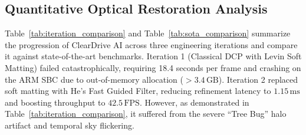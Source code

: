 \documentclass[conference]{IEEEtran}
\begin{document}
\begin{table}[t]
\centering
\caption{State-of-the-Art Quantitative Comparison on RESIDE Outdoor (SOTS) and Foggy Cityscapes Benchmarks}
\label{tab:sota_comparison}
\end{table}

\subsection{Quantitative Optical Restoration Analysis}
Table~\ref{tab:iteration_comparison} and Table~\ref{tab:sota_comparison} summarize the progression of ClearDrive AI across three engineering iterations and compare it against state-of-the-art benchmarks. 
Iteration 1 (Classical DCP with Levin Soft Matting) failed catastrophically, requiring 18.4 seconds per frame and crashing on the ARM SBC due to out-of-memory allocation ($>3.4\,\text{GB}$).
Iteration 2 replaced soft matting with He's Fast Guided Filter, reducing refinement latency to $1.15\,\text{ms}$ and boosting throughput to $42.5\,\text{FPS}$. However, as demonstrated in Table~\ref{tab:iteration_comparison}, it suffered from the severe ``Tree Bug'' halo artifact and temporal sky flickering.
\end{document}
